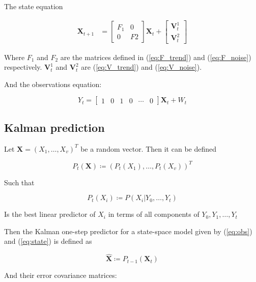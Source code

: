 The state equation

\begin{align}
	\bm{X}_{t+1}	&= 
	\begin{bmatrix}
		F_1	& 0 \\
		0	& F2
	\end{bmatrix} \bm{X}_{t} +
	\begin{bmatrix}
		\bm{V}_t^1 \\
		\bm{V}_t^2
	\end{bmatrix}
\end{align}

Where $F_1$ and $F_2$ are the matrices defined in (\ref{eq:F_trend}) and (\ref{eq:F_noise}) respectively. $\bm{V}_t^1$ and $\bm{V}_t^2$ are (\ref{eq:V_trend}) and (\ref{eq:V_noise}).


And the observations equation:

\begin{equation}
	Y_t = 	\begin{bmatrix}1 & 0 & 1 & 0 & \cdots & 0\end{bmatrix}\bm{X}_{t} + W_t
\end{equation}



\subsection{Kalman prediction}

Let $\bm{X} = (X_1, \ldots, X_v)^T$ be a random vector. Then it can be defined 

\begin{equation}
	P_t(\bm{X}) \coloneqq (P_t(X_1), \ldots, P_t(X_v))^T
\end{equation}

Such that 

\begin{equation}
	P_t(X_i) \coloneqq P(X_i | Y_0, \ldots, Y_t)
\end{equation}

Is the best linear predictor of $X_i$ in terms of all components of $Y_0, Y_1, \ldots, Y_t$ \cite{brockwell2016introduction}


Then the Kalman one-step predictor for a state-space model given by (\ref{eq:obs}) and (\ref{eq:state}) is defined as 

\begin{equation}
	\hat{\bm{X}} \coloneqq P_{t-1}(\bm{X}_t)
\end{equation}

And their error covariance matrices:

